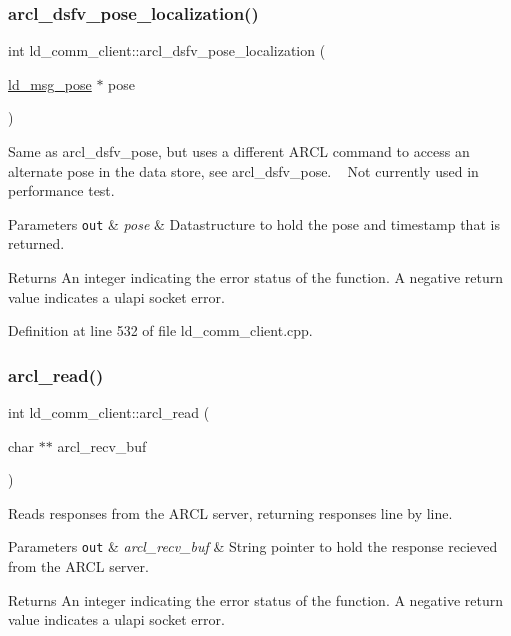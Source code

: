 \subsubsection{\texorpdfstring{arcl\+\_\+dsfv\+\_\+pose\+\_\+localization()}{arcl\_dsfv\_pose\_localization()}}
{\footnotesize\ttfamily int ld\+\_\+comm\+\_\+client\+::arcl\+\_\+dsfv\+\_\+pose\+\_\+localization (\begin{DoxyParamCaption}\item[{\mbox{\hyperlink{structld__msg__pose}{ld\+\_\+msg\+\_\+pose}} $\ast$}]{pose }\end{DoxyParamCaption})}

Same as arcl\+\_\+dsfv\+\_\+pose, but uses a different A\+R\+CL command to access an alternate pose in the data store, see arcl\+\_\+dsfv\+\_\+pose. ~\newline
Not currently used in performance test. 
\begin{DoxyParams}[1]{Parameters}
\mbox{\tt out}  & {\em pose} & Datastructure to hold the pose and timestamp that is returned. \\
\hline
\end{DoxyParams}
\begin{DoxyReturn}{Returns}
An integer indicating the error status of the function. A negative return value indicates a ulapi socket error. 
\end{DoxyReturn}


Definition at line 532 of file ld\+\_\+comm\+\_\+client.\+cpp.

\mbox{\label{classld__comm__client_ad43c866e91c88f9dfd7e50fdec941607}} 
\subsubsection{\texorpdfstring{arcl\+\_\+read()}{arcl\_read()}}
{\footnotesize\ttfamily int ld\+\_\+comm\+\_\+client\+::arcl\+\_\+read (\begin{DoxyParamCaption}\item[{char $\ast$$\ast$}]{arcl\+\_\+recv\+\_\+buf }\end{DoxyParamCaption})}

Reads responses from the A\+R\+CL server, returning responses line by line. 
\begin{DoxyParams}[1]{Parameters}
\mbox{\tt out}  & {\em arcl\+\_\+recv\+\_\+buf} & String pointer to hold the response recieved from the A\+R\+CL server. \\
\hline
\end{DoxyParams}
\begin{DoxyReturn}{Returns}
An integer indicating the error status of the function. A negative return value indicates a ulapi socket error. 
\end{DoxyReturn}


